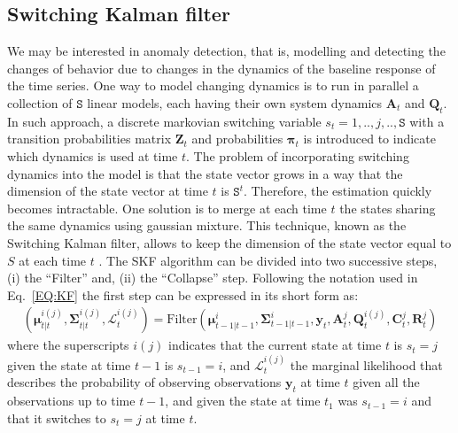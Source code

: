 \subsection{Switching Kalman filter}
\label{SS:THSKF}
We may be interested in anomaly detection, that is, modelling and detecting the changes of behavior due to changes in the dynamics of the baseline response of the time series.
One way to model changing dynamics is to run in parallel a collection of ${\mathtt{S}}$ linear models, each having their own system dynamics $\mathbf{A}_{t}$ and $ \mathbf{Q}_{t}$.
In such approach, a discrete markovian switching variable $s_{t}= 1, ..,j,.. ,\mathtt{S}$ with a transition probabilities matrix $\mathbf{Z}_{t}$ and probabilities $\bm{\pi}_{t}$ is introduced to indicate which dynamics is used at time $t$.
The problem of incorporating switching dynamics into the model is that the state vector grows in a way that the dimension of the state vector at time $t$ is $\mathtt{S}^{t}$.
Therefore, the estimation quickly becomes intractable.
One solution is to merge at each time $t$ the states sharing the same dynamics using gaussian mixture.
This technique, known as the Switching Kalman filter, allows to keep the dimension of the state vector equal to $S$ at each time $t$ \cite{murphy2012machine}.
The SKF algorithm can be divided into two successive steps, (i) the ``Filter'' and, (ii) the ``Collapse'' step.
Following the notation used in Eq.~\ref{EQ:KF} the first step can be expressed in its short form as:
\begin{equation}
  \begin{split}
  (\bm{\mu}_{t|t}^{i(j)},\bm{\Sigma}_{t|t}^{i(j)}, \mathcal{L}_{t}^{i(j)}) = \text{Filter}(\bm{\mu}_{t-1|t-1}^{i},\bm{\Sigma}_{t-1|t-1}^{i}, \mathbf{y}_{t}, \mathbf{A}_{t}^{j},  \mathbf{Q}_{t}^{i(j)},   \mathbf{C}^{j}_{t},  \mathbf{R}^{j}_{t})
    \end{split}
\label{EQ:SKF1}
\end{equation}
where the superscripts $i(j)$ indicates that the current state at time $t$ is $s_{t}=j$ given the state at time $t-1$ is $s_{t-1}=i$, and
$ \mathcal{L}_{t}^{i(j)}$  the marginal likelihood that describes the probability of observing observations $\mathbf{y}_{t}$ at time $t$ given all the observations up to time $t-1$, and given the state at time $t_1$ was $s_{t-1} = i$ and that it switches to $s_{t} = j$ at time $t$.
